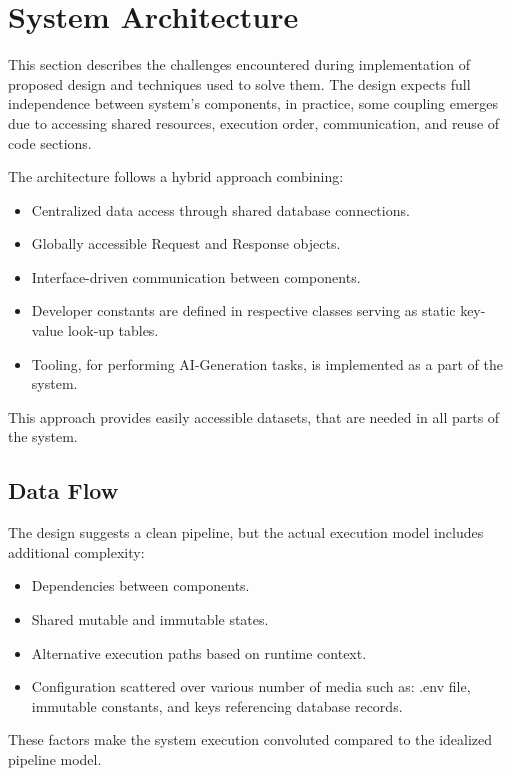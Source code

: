 \chapter{System Architecture}\label{ch:system-architecture}
This section describes the challenges encountered during implementation of proposed design and techniques used to solve them.
The design expects full independence between system's components, in practice, some coupling emerges due to accessing shared
resources, execution order, communication, and reuse of code sections.

The architecture follows a hybrid approach combining:
\begin{itemize}
    \item Centralized data access through shared database connections.
    \item Globally accessible Request and Response objects.
    \item Interface-driven communication between components.
    \item Developer constants are defined in respective classes serving as static key-value look-up tables.
    \item Tooling, for performing AI-Generation tasks, is implemented as a part of the system.
\end{itemize}

This approach provides easily accessible datasets, that are needed in all parts of the system.



\section{Data Flow}\label{sec:architecture-data-flow}
The design suggests a clean pipeline, but the actual execution model includes additional complexity:

\begin{itemize}
    \item Dependencies between components.
    \item Shared mutable and immutable states.
    \item Alternative execution paths based on runtime context.
    \item Configuration scattered over various number of media such as: .env file, immutable constants, and keys referencing database records.
\end{itemize}

These factors make the system execution convoluted compared to the idealized pipeline model.

